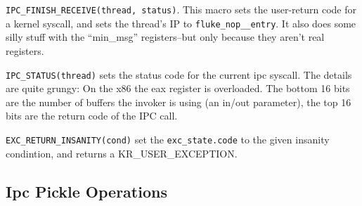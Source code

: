 {\tt IPC_FINISH_RECEIVE(thread, status)}.  This macro sets the
user-return code for a kernel syscall, and sets the thread's
IP to {\tt fluke_nop__entry}.  It also does some silly stuff
with the ``min_msg'' registers--but only because they aren't
real registers.

{\tt IPC_STATUS(thread)} sets the status code for the current ipc
syscall.  The details are quite grungy:  On the x86 the eax register
is overloaded.  The bottom 16 bits are the number of buffers
the invoker is using (an in/out parameter), the top 16 bits are
the return code of the IPC call.

{\tt EXC_RETURN_INSANITY(cond)} set the {\tt exc_state.code} to
the given insanity condintion, and returns a KR_USER_EXCEPTION.


\subsection{Ipc Pickle Operations}

